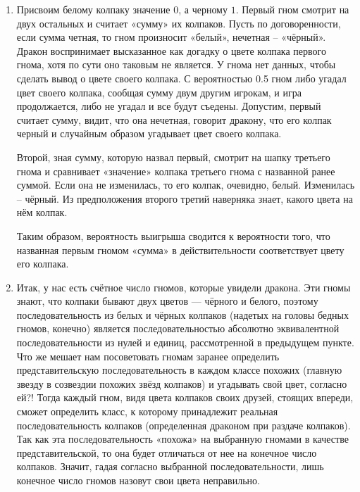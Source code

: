 \documentclass[nobib]{tufte-handout}
\theoremstyle{definition}
\newcounter{problem}
\newenvironment{problem}%
{%
\refstepcounter{problem}%
     \hypertarget{problem:{\theproblem}}{}
     \Writetofile{solution_file}{\protect\hypertarget{soln:\theproblem}{}}
     \begin{myenum}[label=\bfseries\protect\hyperlink{soln:\theproblem}{\theproblem},ref=\theproblem]
     \item%
    }%
    {%
    \end{myenum}}
\begin{document}
\begin{problem}
\begin{sol}
\begin{enumerate}
\item Присвоим белому колпаку значение $0$, а черному $1$. Первый гном смотрит
на двух остальных и считает «сумму» их колпаков. Пусть по договоренности,
если сумма четная, то гном произносит «белый», нечетная – «чёрный».
Дракон воспринимает высказанное как догадку о цвете колпака первого гнома,
хотя по сути оно таковым не является. У гнома нет данных,
чтобы сделать вывод о цвете своего колпака. С вероятностью 0.5 гном
либо угадал цвет своего колпака, сообщая сумму двум другим игрокам,
и игра продолжается, либо не угадал и все будут съедены.
Допустим, первый считает сумму, видит, что она нечетная, говорит дракону,
что его колпак черный и случайным образом угадывает цвет своего колпака.

Второй, зная сумму, которую назвал первый, смотрит на шапку третьего гнома
и сравнивает «значение» колпака третьего гнома с названной ранее суммой.
Если она не изменилась, то его колпак, очевидно, белый. Изменилась – чёрный.
Из предположения второго третий наверняка знает, какого цвета на нём колпак.

Таким образом, вероятность выигрыша сводится к вероятности того,
что названная первым гномом «сумма» в действительности соответствует цвету его колпака.

\item Итак, у нас есть счётное число гномов, которые увидели дракона.
Эти гномы знают, что колпаки бывают двух цветов — чёрного и белого,
поэтому последовательность из белых и чёрных колпаков
(надетых на головы бедных гномов, конечно)
является последовательностью
абсолютно эквивалентной последовательности из нулей и единиц,
рассмотренной в предыдущем пункте.
Что же мешает нам посоветовать гномам заранее определить
представительскую последовательность в каждом классе похожих
(главную звезду в созвездии похожих звёзд колпаков) и угадывать свой цвет, согласно ей?!
Тогда каждый гном, видя цвета колпаков своих друзей, стоящих впереди,
сможет определить класс, к которому принадлежит реальная последовательность колпаков
(определенная драконом при раздаче колпаков).
Так как эта последовательность «похожа»
на выбранную гномами в качестве представительской,
то она будет отличаться от нее на конечное число колпаков.
Значит, гадая согласно выбранной последовательности,
лишь конечное число гномов назовут свои цвета неправильно.
\end{enumerate}
\end{sol}

\end{problem}
\end{document}
